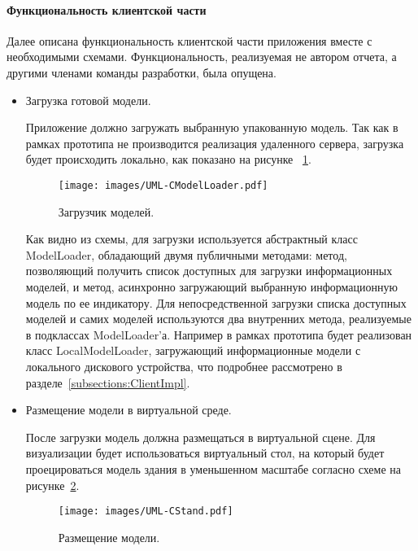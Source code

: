 ﻿\paragraph{Функциональность клиентской части}

Далее описана функциональность клиентской части приложения
вместе с необходимыми схемами.
Функциональность, реализуемая не автором отчета,
а другими членами команды разработки, была опущена.

\begin{itemize}
    \item {
        Загрузка готовой модели.

        Приложение должно загружать выбранную упакованную модель.
        Так как в рамках прототипа не производится реализация удаленного сервера,
        загрузка будет происходить локально, как показано на рисунке~%
        \ref{figure:CModelLoader}.

        \begin{figure}[ht]
            \centering
            \texttt{[image: images/UML-CModelLoader.pdf]}
            \caption{Загрузчик моделей.}
            \label{figure:CModelLoader}
        \end{figure}

        Как видно из схемы, для загрузки используется абстрактный класс ModelLoader,
        обладающий двумя публичными методами: метод, позволяющий получить список
        доступных для загрузки информационных моделей, и метод,
        асинхронно загружающий выбранную информационную модель по ее индикатору.
        Для непосредственной загрузки списка доступных моделей и самих моделей
        используются два внутренних метода, реализуемые в подклассах ModelLoader'а.
        Например в рамках прототипа будет реализован класс LocalModelLoader,
        загружающий информационные модели с локального дискового устройства,
        что подробнее рассмотрено в разделе~\ref{subsections:ClientImpl}.
    } 
    \item {
        Размещение модели в виртуальной среде.

        После загрузки модель должна размещаться в виртуальной сцене.
        Для визуализации будет использоваться виртуальный стол,
        на который будет проецироваться модель здания
        в уменьшенном масштабе согласно схеме на рисунке~\ref{figure:CStand}.

        \begin{figure}[ht]
            \centering
            \texttt{[image: images/UML-CStand.pdf]}
            \caption{Размещение модели.}
            \label{figure:CStand}
        \end{figure}

}
\end{itemize}
